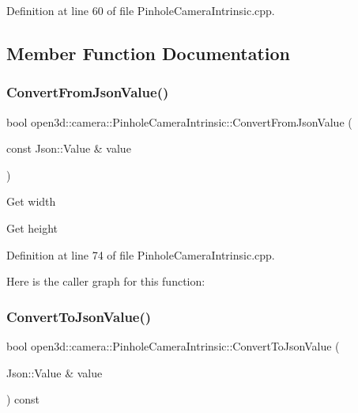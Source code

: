 Definition at line 60 of file Pinhole\+Camera\+Intrinsic.\+cpp.



\subsection{Member Function Documentation}
\mbox{\label{classopen3d_1_1camera_1_1_pinhole_camera_intrinsic_a0b9d6853df2fd01aa3e9397c4d4c55a0}} 
\subsubsection{\texorpdfstring{ConvertFromJsonValue()}{ConvertFromJsonValue()}}
{\footnotesize\ttfamily bool open3d\+::camera\+::\+Pinhole\+Camera\+Intrinsic\+::\+Convert\+From\+Json\+Value (\begin{DoxyParamCaption}\item[{const Json\+::\+Value \&}]{value }\end{DoxyParamCaption})\hspace{0.3cm}{\ttfamily [override]}}

Get width

Get height 

Definition at line 74 of file Pinhole\+Camera\+Intrinsic.\+cpp.

Here is the caller graph for this function\+:
\mbox{\label{classopen3d_1_1camera_1_1_pinhole_camera_intrinsic_ac66896c0b913a13760c70261f2765d66}} 
\subsubsection{\texorpdfstring{ConvertToJsonValue()}{ConvertToJsonValue()}}
{\footnotesize\ttfamily bool open3d\+::camera\+::\+Pinhole\+Camera\+Intrinsic\+::\+Convert\+To\+Json\+Value (\begin{DoxyParamCaption}\item[{Json\+::\+Value \&}]{value }\end{DoxyParamCaption}) const\hspace{0.3cm}{\ttfamily [override]}}

